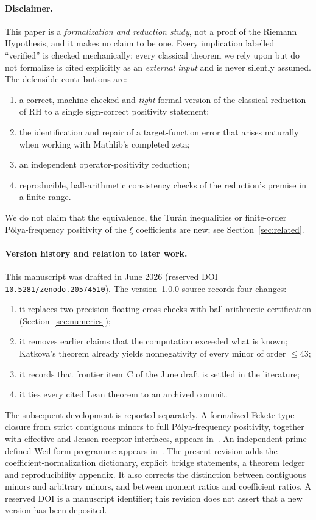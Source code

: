 \documentclass[11pt]{article}
\theoremstyle{plain}
\theoremstyle{definition}
\theoremstyle{remark}
\begin{document}
\paragraph{Disclaimer.} This paper is a \emph{formalization and reduction study},
not a proof of the Riemann Hypothesis, and it makes no claim to be one. Every
implication labelled ``verified'' is checked mechanically; every classical theorem
we rely upon but do not formalize is cited explicitly as an \emph{external input}
and is never silently assumed. The defensible contributions are:
\begin{enumerate}
  \item a correct, machine-checked and \emph{tight} formal version of the classical
    reduction of RH to a single sign-correct positivity statement;
  \item the identification and repair of a target-function error that arises
    naturally when working with Mathlib's completed zeta;
  \item an independent operator-positivity reduction;
  \item reproducible, ball-arithmetic consistency checks of the reduction's premise
    in a finite range.
\end{enumerate}
We do not claim that the equivalence, the Turán inequalities or finite-order
Pólya-frequency positivity of the $\xi$ coefficients are new; see
Section~\ref{sec:related}.

\paragraph{Version history and relation to later work.} This manuscript was
drafted in June 2026 (reserved DOI \texttt{10.5281/zenodo.20574510}).
The version~1.0.0 source records four changes:
\begin{enumerate}
  \item it replaces two-precision floating cross-checks with ball-arithmetic
    certification (Section~\ref{sec:numerics});
  \item it removes earlier claims that the computation exceeded what is known;
    Katkova's theorem already yields nonnegativity of every minor of order
    $\le 43$;
  \item it records that frontier item~C of the June draft is settled in the
    literature;
  \item it ties every cited Lean theorem to an archived commit.
\end{enumerate}
The subsequent development is reported separately. A formalized Fekete-type
closure from strict contiguous minors to full Pólya-frequency positivity, together
with effective and Jensen receptor interfaces, appears in~\cite{Mondal2026TwoRoutes}.
An independent prime-defined Weil-form programme appears in~\cite{Mondal2026Weil}.
The present revision adds the coefficient-normalization dictionary, explicit
bridge statements, a theorem ledger and reproducibility appendix. It also
corrects the distinction between contiguous minors and arbitrary minors, and
between moment ratios and coefficient ratios. A reserved DOI is a manuscript
identifier; this revision does not assert that a new version has been deposited.
\end{document}
